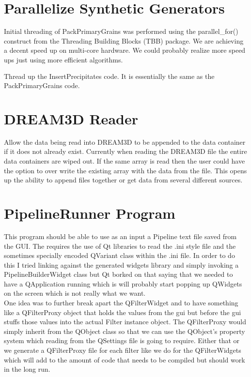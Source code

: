 \documentclass[12pt]{article} %
\begin{document}
\section{Parallelize Synthetic Generators}
   Initial threading of PackPrimaryGrains was performed using the parallel\_for() construct from the Threading Building Blocks (TBB) package. We are achieving a decent speed up on multi-core hardware. We could probably realize more speed ups just using more efficient algorithms.
   
   Thread up the InsertPrecipitates code. It is essentially the same as the PackPrimaryGrains code.

\section{DREAM3D Reader}
 Allow the data being read into DREAM3D to be appended to the data container if it does not already exist. Currently when reading the DREAM3D file the entire data containers are wiped out. If the same array is read then the user could have the option to over write the existing array with the data from the file. This opens up the ability to append files together or get data from several different sources.  
 
\section{PipelineRunner Program}
  This program should be able to use as an input a Pipeline text file saved from the GUI. The requires the use of Qt libraries to read the .ini style file and the sometimes specially encoded QVariant class within the .ini file. In order to do this I tried linking against the generated widgets library and simply invoking a PipelineBuilderWidget class but Qt borked on that saying that we needed to have a QApplication running which is will probably start popping up QWidgets on the screen which is not really what we want.\\
  
  
 One idea was to further break apart the QFilterWidget and to have something like a QFilterProxy object that holds the values from the gui but before the gui stuffs those values into the actual Filter instance object. The QFilterProxy would simply inherit from the QObject class so that we can use the QObject's property system which reading from the QSettings file is going to require. Either that or we generate a QFilterProxy file for each filter like we do for the QFilterWidgets which will add to the amount of code that needs to be compiled but should work in the long run.
\end{document}
